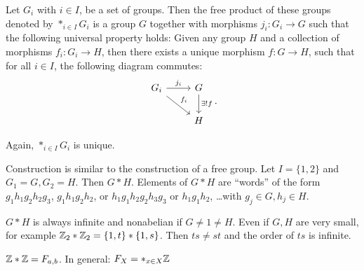 \begin{definition}
    Let $G_i$ with  $i \in I$, be a set of groups.
    Then the free product of  these groups denoted by $*_{i \in I}G_i$ is a group $G$ together with morphisms $j_i: G_i \to  G$ such that the following universal property holds:
    Given any group $H$ and a collection of morphisms $f_i: G_i \to H$, then there exists a unique morphism $f: G \to  H$, such that for all $i \in I$, the following diagram commutes:
    \[
    \begin{tikzcd}
        G_i \arrow[r, "j_i"] \arrow[dr, "f_i"] & G \arrow[d, "\exists! f"]\\
                                               & H
    \end{tikzcd}
    .\] 
\end{definition}
\begin{note}
    Again, $*_{i \in I} G_i$ is unique.
\end{note}
\begin{eg}
    Construction is similar to the construction of a free group.
    Let $I = \{1, 2\}$ and $G_1 =G, G_2 = H$.
    Then $G*H$.
    Elements of $G*H$ are ``words'' of the form $g_1h_1g_2h_2g_3$, $g_1 h_1g_2h_2$, or $h_1 g_1h_2g_2h_3g_3$ or $h_1g_1h_2$, \ldots with $g_j\in G, h_j \in H$.
\end{eg}
\begin{note}
    $G*H$ is always infinite and nonabelian if $G \neq 1 \neq H$.
    Even if $G, H$ are very small, for example $\mathbb{Z}_2 * \mathbb{Z}_2 = \{1, t\} * \{1, s\}$. Then $ts \neq st$ and the order of $ts$ is infinite.
\end{note}

\begin{note}
    $\mathbb{Z} * \mathbb{Z} = F_{a, b}$. In general: $F_X = *_{x \in X} \mathbb{Z}$
\end{note}

\setcounter{section}{69}
